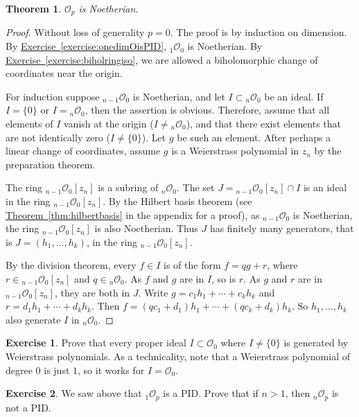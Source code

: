 \documentclass[12pt,openany]{book}
\newcommand{\sO}{{\mathscr{O}}}
\theoremstyle{plain}
\newtheorem{thm}{Theorem}[section]
\theoremstyle{remark}
\theoremstyle{definition}
\newenvironment{exbox}{%
    \def\FrameCommand{\vrule width 1pt \relax\hspace{10pt}}%
    \MakeFramed{\advance\hsize-\width\FrameRestore}%
}{%
    \endMakeFramed
}
\theoremstyle{exercise}
\newtheorem{exercise}{Exercise}[section]
\theoremstyle{example}
\newcommand{\exerciseref}[1]{\hyperref[#1]{Exercise~\ref*{#1}}}
\newcommand{\thmref}[1]{\hyperref[#1]{Theorem~\ref*{#1}}}
\begin{document}
\begin{thm}
$\sO_p$ is Noetherian.
\end{thm}

\begin{proof}
Without loss of generality $p=0$.
The proof is by induction on dimension.
By \exerciseref{exercise:onedimOisPID}, ${}_1\sO_0$ is Noetherian.
By \exerciseref{exercise:biholringiso}, we are allowed a
biholomorphic change of coordinates near the origin.

For induction suppose ${}_{n-1}\sO_0$ is Noetherian, and let $I \subset
{}_n \sO_0$ be an ideal.
If $I = \{ 0 \}$
or $I = {}_n \sO_0$, then the assertion is obvious.  Therefore, assume
that all elements of $I$ vanish at the origin ($I \not= {}_n \sO_0$), and
that there exist elements that are not identically zero
($I \not= \{ 0 \}$).  Let $g$
be such an element.  After perhaps a linear change of coordinates,
assume $g$ is a Weierstrass polynomial in $z_n$
by the preparation theorem.

The ring ${}_{n-1}\sO_0[z_n]$ is a subring of ${}_n \sO_0$.
The set $J= {}_{n-1}\sO_0[z_n] \cap I$ is an ideal in the
ring ${}_{n-1}\sO_0[z_n]$.  By the Hilbert basis theorem (see
\thmref{thm:hilbertbasis} in the appendix for a proof), as
${}_{n-1}\sO_0$ is Noetherian, the ring
${}_{n-1}\sO_0[z_n]$ is also Noetherian.  Thus $J$ has finitely many
generators,
that is $J = (h_1,\ldots,h_k)$, in the ring ${}_{n-1}\sO_0[z_n]$.

By the division theorem,
every $f \in I$ is of the form $f = qg+r$, where $r \in {}_{n-1}\sO_0[z_n]$
and $q \in {}_n\sO_0$.
As $f$ and $g$ are in $I$, so is $r$.
As $g$ and $r$ are in ${}_{n-1}\sO_0[z_n]$,
they are both in $J$.
Write
$g = c_1 h_1 + \cdots + c_k h_k$ and
$r = d_1 h_1 + \cdots + d_k h_k$.  Then
$f = (qc_1 + d_1) h_1 + \cdots + (qc_k + d_k) h_k$.
So
$h_1,\ldots,h_k$ also generate $I$ in ${}_n \sO_0$.
\end{proof}

\begin{exbox}
\begin{exercise}
Prove that every proper ideal $I \subset \sO_0$ where $I \not= \{ 0 \}$
is generated by Weierstrass polynomials.  As a technicality,
note that a
Weierstrass polynomial of degree $0$ is just $1$, so it works for $I = \sO_0$.
\end{exercise}

\begin{exercise}
We saw above that
${}_1\sO_p$ is a PID\@.  Prove that
if $n > 1$, then ${}_n\sO_p$ is not a PID\@.
\end{exercise}
\end{exbox}
\end{document}
